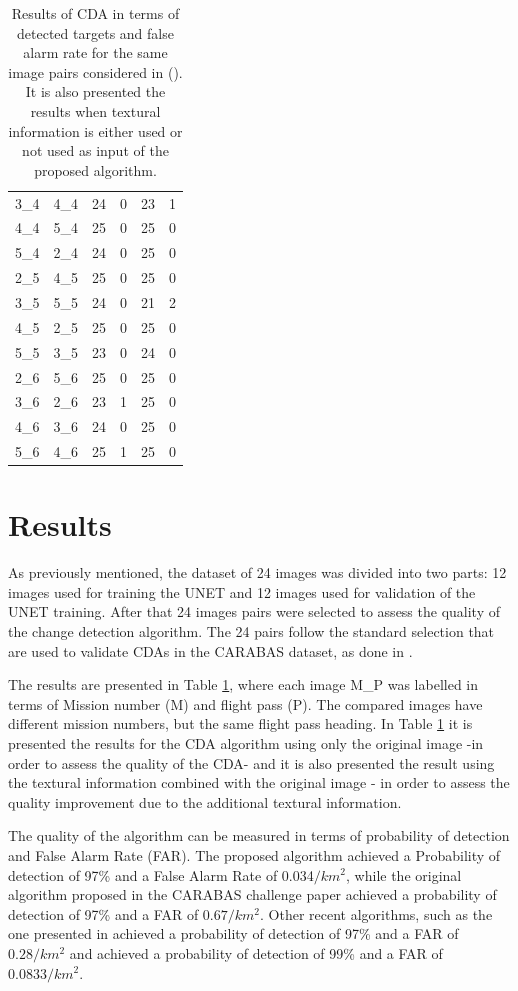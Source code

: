 \begin{table}[ht]
\begin{tabular}{c|c||c|c|c|c}
         3\_4&4\_4&24&0&23&1\\
         4\_4&5\_4&25&0&25&0\\
         5\_4&2\_4&24&0&25&0\\
         \hline
         2\_5&4\_5&25&0&25&0\\
         3\_5&5\_5&24&0&21&2\\
         4\_5&2\_5&25&0&25&0\\
         5\_5&3\_5&23&0&24&0\\
         \hline
         2\_6&5\_6&25&0&25&0\\
         3\_6&2\_6&23&1&25&0\\
         4\_6&3\_6&24&0&25&0\\
         5\_6&4\_6&25&1&25&0\\
    \end{tabular}
    \caption{Results of CDA in terms of detected targets and false alarm rate  for the same image pairs considered in (\cite{Carabas}). It is also presented  the results when textural information is either used or not used as input of the proposed algorithm.}
    \label{tab:my_table}
\end{table}

\section{Results}

As previously mentioned, the dataset of 24 images was divided into two parts: 12 images used for training the UNET and 12 images used for validation of the UNET training.
After that 24 images pairs were selected to assess the quality of the change detection algorithm. The 24 pairs follow the standard selection that are used to validate CDAs in the CARABAS dataset, as done in \cite{Carabas,Ricardo,LucasRamos}.

The results are presented in Table \ref{tab:my_table}, where each image M\_P was labelled in terms of Mission number (M) and flight pass (P). The compared images have different mission numbers, but the same flight pass heading.
In Table \ref{tab:my_table} it is presented the results for the CDA algorithm using only the original image -in order to assess the quality of the CDA-  and it is also presented the result using the textural information combined with the original image -
in order to assess the quality improvement due to the additional textural information.

The quality of the algorithm can be measured in terms of probability of detection and False Alarm Rate (FAR). The proposed algorithm achieved a Probability of detection of 97\% and a False Alarm Rate of 0.034${/} km^2$, while the original algorithm proposed in the CARABAS
challenge paper achieved a probability of detection of 97\% and a FAR of  $0.67{/} km^2$. Other recent algorithms, such as the one presented in \cite{Ricardo} achieved a probability of detection of 97\% and a FAR of $0.28{/} km^2$ and \cite{Vinholi} achieved a 
probability of detection of 99\% and a FAR of $0.0833{/} km^2$. 

